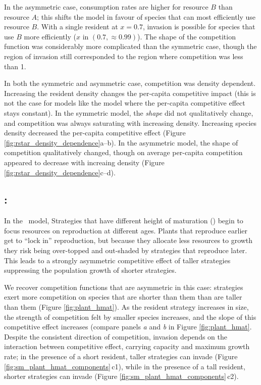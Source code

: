 \documentclass[a4paper,11pt]{article}
\begin{document}
In the asymmetric case, consumption rates are higher for
resource $B$ than resource $A$; this shifts the model in favour of
species that can most efficiently use resource $B$.
%
With a single resident at $x = 0.7$, invasion is possible for species
that use $B$ more efficiently ($x$ in $(0.7, \approx 0.99)$).
%
The shape of the competition function was considerably more
complicated than the symmetric case, though the region of invasion
still corresponded to the region where competition was less than 1.

In both the symmetric and asymmetric case, competition was density
dependent.  Increasing the resident density changes the per-capita
competitive impact (this is not the case for models like the
\citet{Dieckmann-1999} model where the per-capita competitive effect
stays constant).
%
In the symmetric model, the \emph{shape} did not qualitatively change,
and competition was always saturating with increasing density.
Increasing species density decreased the per-capita competitive effect
(Figure \ref{fig:rstar_density_dependence}a--b).
%
In the asymmetric model, the shape of competition qualitatively
changed, though on average per-capita competition appeared to decrease
with increaing density (Figure
\ref{fig:rstar_density_dependence}c--d).

\subsection{\plant: \hmat}

In the \plant\ model, Strategies that have different height of
maturation (\hmat) begin to focus resources on reproduction at
different ages.  Plants that reproduce earlier get to ``lock in''
reproduction, but because they allocate less resources to growth they
risk being over-topped and out-shaded by strategies that reproduce
later.  This leads to a strongly asymmetric competitive effect of
taller strategies suppressing the population growth of shorter
strategies.

We recover competition functions that are asymmetric in this case:
strategies exert more competition on species that are shorter than
them than are taller than them (Figure \ref{fig:plant_hmat}).  As the
resident strategy increases in size, the strength of competition felt
by smaller species increases, and the slope of this competitive effect
increases (compare panels \textit{a} and \textit{b} in Figure
\ref{fig:plant_hmat}.
%
Despite the consistent direction of competition, invasion depends on
the interaction between competitive effect, carrying capacity and
maximum growth rate; in the presence of a short resident, taller
strategies can invade (Figure \ref{fig:sm_plant_hmat_components}\,c1),
while in the presence of a tall resident, shorter strategies can
invade (Figure \ref{fig:sm_plant_hmat_components}\,c2).
\end{document}
